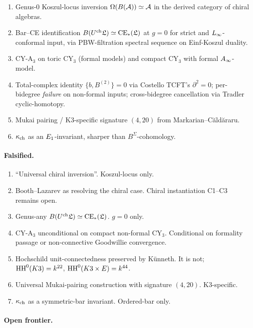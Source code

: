 \begin{enumerate}
\item Genus-$0$ Koszul-locus inversion $\Omega(B(\mathcal{A})) \simeq \mathcal{A}$
in the derived category of chiral algebras.
\item Bar--CE identification
$B(U^{\mathrm{ch}}\mathfrak{L}) \simeq \mathrm{CE}_*(\mathfrak{L})$ at $g = 0$ for strict
and $L_\infty$-conformal input, via PBW-filtration spectral
sequence on Einf-Koszul duality.
\item CY-A$_3$ on toric CY$_3$ (formal models) and compact CY$_3$
with formal $A_\infty$-model.
\item Total-complex identity $\{b, B^{(2)}\} = 0$ via
Costello TCFT's $\partial^2 = 0$; per-bidegree \emph{failure}
on non-formal inputs; cross-bidegree cancellation via Tradler
cyclic-homotopy.
\item Mukai pairing / K3-specific signature $(4, 20)$ from
Markarian--C\u{a}ld\u{a}raru.
\item $\kappa_{\mathrm{ch}}$ as an $E_1$-invariant, sharper than
$B^\Sigma$-cohomology.
\end{enumerate}

\paragraph{Falsified.}

\begin{enumerate}
\item ``Universal chiral inversion''. Koszul-locus only.
\item Booth--Lazarev as resolving the chiral case. Chiral
instantiation C1--C3 remains open.
\item Genus-any $B(U^{\mathrm{ch}}\mathfrak{L}) \simeq \mathrm{CE}_*(\mathfrak{L})$.
$g = 0$ only.
\item CY-A$_3$ unconditional on compact non-formal CY$_3$.
Conditional on formality passage or non-connective
Goodwillie convergence.
\item Hochschild unit-connectedness preserved by K\"unneth. It
is not; $\mathrm{HH}^0(K3) = k^{22}$, $\mathrm{HH}^0(K3 \times E) = k^{44}$.
\item Universal Mukai-pairing construction with signature
$(4, 20)$. K3-specific.
\item $\kappa_{\mathrm{ch}}$ as a symmetric-bar invariant. Ordered-bar only.
\end{enumerate}

\paragraph{Open frontier.}


